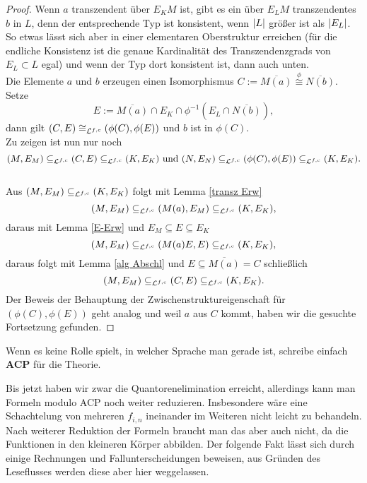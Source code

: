 \begin{proof}
    	Wenn $a$ transzendent über $E_KM$ ist, gibt es ein über $E_LM$ transzendentes $b$ in $L$, denn der entsprechende Typ ist konsistent, wenn ${\left| L \right|}$ größer ist als ${\left| E_L \right|}$. So etwas lässt sich aber in einer elementaren Oberstruktur erreichen (für die endliche Konsistenz ist die genaue Kardinalität des Transzendenzgrads von $E_L\subset L$ egal) und wenn der Typ dort konsistent ist, dann auch unten.\\
    	Die Elemente $a$ und $b$ erzeugen einen Isomorphismus $C:=\overline{M(a)}\overset{\phi}{\cong}\overline{N(b)}$. Setze $$E:=\overline{M(a)}\cap E_K\cap\phi^{-1}(E_L\cap\overline{N(b)}),$$ dann gilt $(C,E)\cong_{\mathcal{L}^{f,c}}(\phi(C),\phi(E))$ und $b$ ist in $\phi(C)$.\\
    	Zu zeigen ist nun nur noch $$(M,E_M)\subseteq_{\mathcal{L}^{f,c}}(C,E)\subseteq_{\mathcal{L}^{f,c}}(K,E_K)\text{ und }(N,E_N)\subseteq_{\mathcal{L}^{f,c}}(\phi(C),\phi(E))\subseteq_{\mathcal{L}^{f,c}}(K,E_K).$$\\
    	Aus $(M,E_M)\subseteq_{\mathcal{L}^{f,c}}(K,E_K)$ folgt mit Lemma \ref{transz Erw} $$(M,E_M)\subseteq_{\mathcal{L}^{f,c}}(M(a),E_M)\subseteq_{\mathcal{L}^{f,c}}(K,E_K),$$ daraus mit Lemma \ref{E-Erw} und $E_M\subseteq E\subseteq E_K$ $$(M,E_M)\subseteq_{\mathcal{L}^{f,c}}(M(a)E,E)\subseteq_{\mathcal{L}^{f,c}}(K,E_K),$$ daraus folgt mit Lemma \ref{alg Abschl} und $E\subseteq\overline{M(a)}=C$ schließlich $$(M,E_M)\subseteq_{\mathcal{L}^{f,c}}(C,E)\subseteq_{\mathcal{L}^{f,c}}(K,E_K).$$
    	Der Beweis der Behauptung der Zwischenstruktureigenschaft für $(\phi(C),\phi(E))$ geht analog und weil $a$ aus $C$ kommt, haben wir die gesuchte Fortsetzung gefunden.
    \end{proof}
    
    \newpage
    
    \begin{definition}
    	Wenn es keine Rolle spielt, in welcher Sprache man gerade ist, schreibe einfach \textbf{ACP} für die Theorie.
    \end{definition}
    
    Bis jetzt haben wir zwar die Quantorenelimination erreicht, allerdings kann man Formeln modulo ACP noch weiter reduzieren. Insbesondere wäre eine \glqq{}Schachtelung\grqq{} von mehreren $f_{i,n}$ ineinander im Weiteren nicht leicht zu behandeln. Nach weiterer Reduktion der Formeln braucht man das aber auch nicht, da die Funktionen in den kleineren Körper abbilden. Der folgende Fakt lässt sich durch einige Rechnungen und Fallunterscheidungen beweisen, aus Gründen des Leseflusses werden diese aber hier weggelassen.
    

